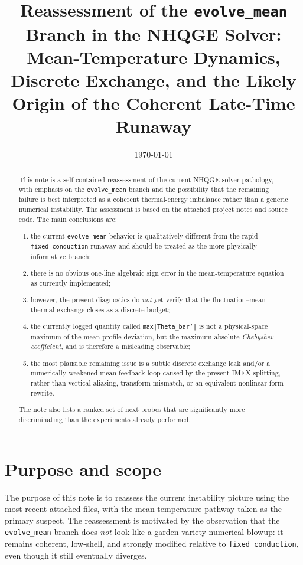 \documentclass[11pt]{article}
\title{Reassessment of the \texttt{evolve\_mean} Branch in the NHQGE Solver:\\
Mean-Temperature Dynamics, Discrete Exchange, and the Likely Origin of the Coherent Late-Time Runaway}
\author{}
\date{\today}
\begin{document}
\maketitle

\begin{abstract}
This note is a self-contained reassessment of the current NHQGE solver pathology, with emphasis on the \texttt{evolve\_mean} branch and the possibility that the remaining failure is best interpreted as a coherent thermal-energy imbalance rather than a generic numerical instability. The assessment is based on the attached project notes and source code. The main conclusions are:

\begin{enumerate}[label=(\roman*)]
\item the current \texttt{evolve\_mean} behavior is qualitatively different from the rapid \texttt{fixed\_conduction} runaway and should be treated as the more physically informative branch;
\item there is no obvious one-line algebraic sign error in the mean-temperature equation as currently implemented;
\item however, the present diagnostics do \emph{not} yet verify that the fluctuation--mean thermal exchange closes as a discrete budget;
\item the currently logged quantity called \texttt{max|Theta\_bar'|} is not a physical-space maximum of the mean-profile deviation, but the maximum absolute \emph{Chebyshev coefficient}, and is therefore a misleading observable;
\item the most plausible remaining issue is a subtle discrete exchange leak and/or a numerically weakened mean-feedback loop caused by the present IMEX splitting, rather than vertical aliasing, transform mismatch, or an equivalent nonlinear-form rewrite.
\end{enumerate}

The note also lists a ranked set of next probes that are significantly more discriminating than the experiments already performed.
\end{abstract}

\tableofcontents

\section{Purpose and scope}

The purpose of this note is to reassess the current instability picture using the most recent attached files, with the mean-temperature pathway taken as the primary suspect. The reassessment is motivated by the observation that the \texttt{evolve\_mean} branch does \emph{not} look like a garden-variety numerical blowup: it remains coherent, low-shell, and strongly modified relative to \texttt{fixed\_conduction}, even though it still eventually diverges.
\end{document}
